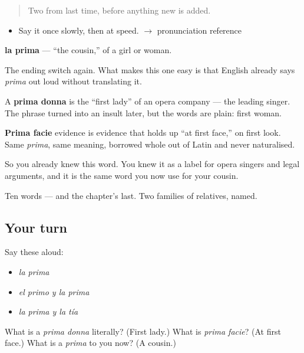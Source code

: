 \label{lesson:ES-C307-prima}



\begin{quote}
Two from last time, before anything new is added.
\end{quote}

\begin{sounds}
\begin{itemize}
\raggedright
  \item Say it once slowly, then at speed. $\to$ pronunciation reference
\end{itemize}
\end{sounds}

\begin{cousinweb}
\textbf{la prima} --- \textquotedblleft{}the cousin,\textquotedblright{} of a girl or woman.

The ending switch again. What makes this one easy is that English already says \emph{prima} out loud without translating it.

A \textbf{prima donna} is the \textquotedblleft{}first lady\textquotedblright{} of an opera company --- the leading singer. The phrase turned into an insult later, but the words are plain: first woman.

\textbf{Prima facie} evidence is evidence that holds up \textquotedblleft{}at first face,\textquotedblright{} on first look. Same \emph{prima}, same meaning, borrowed whole out of Latin and never naturalised.

So you already knew this word. You knew it as a label for opera singers and legal arguments, and it is the same word you now use for your cousin.
\end{cousinweb}

\begin{grammarlens}[title={What you've built}]
Ten words --- and the chapter's last. Two families of relatives, named.
\end{grammarlens}

\subsection*{Your turn}
Say these aloud:

\begin{itemize}
\raggedright
  \item \emph{la prima}
  \item \emph{el primo y la prima}
  \item \emph{la prima y la tía}
\end{itemize}

\begin{tcolorbox}[breakable,colback=teal!4,colframe=teal!35!black,title={Before you move on}]
What is a \emph{prima donna} literally? (First lady.) What is \emph{prima facie}? (At first face.) What is a \emph{prima} to you now? (A cousin.)
\end{tcolorbox}
